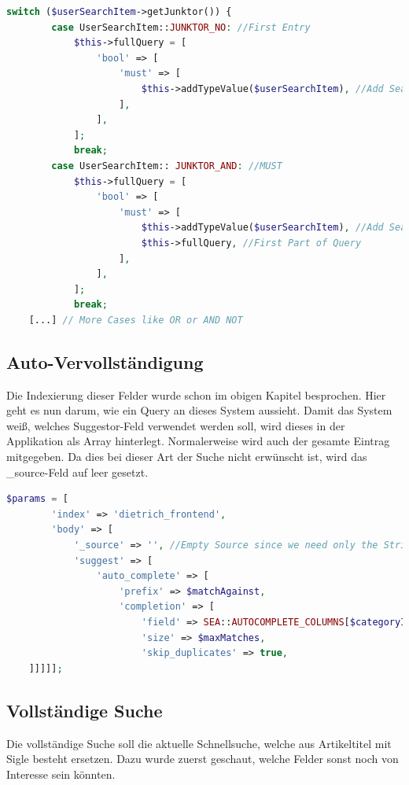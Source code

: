 \begin{lstlisting}[language=PHP, frame=single, label={lst:booleanEla}] 
    switch ($userSearchItem->getJunktor()) {
        case UserSearchItem::JUNKTOR_NO: //First Entry
            $this->fullQuery = [
                'bool' => [
                    'must' => [
                        $this->addTypeValue($userSearchItem), //Add Search
                    ],
                ],
            ];
            break;
        case UserSearchItem:: JUNKTOR_AND: //MUST
            $this->fullQuery = [
                'bool' => [
                    'must' => [
                        $this->addTypeValue($userSearchItem), //Add Search
                        $this->fullQuery, //First Part of Query
                    ],
                ],
            ];
            break;
    [...] // More Cases like OR or AND NOT
\end{lstlisting}

\subsection{Auto-Vervollständigung}

Die Indexierung dieser Felder wurde schon im obigen Kapitel besprochen. Hier geht es nun darum, wie ein Query an dieses System aussieht. Damit das System weiß, welches Suggestor-Feld verwendet werden soll, wird dieses in der Applikation als Array hinterlegt. Normalerweise wird auch der gesamte Eintrag mitgegeben. Da dies bei dieser Art der Suche nicht erwünscht ist, wird das \_source-Feld auf leer gesetzt.


\begin{lstlisting}[language=PHP, frame=single, label={lst:autocompleParams}] 
    $params = [
        'index' => 'dietrich_frontend',
        'body' => [
            '_source' => '', //Empty Source since we need only the String
            'suggest' => [
                'auto_complete' => [
                    'prefix' => $matchAgainst,
                    'completion' => [
                        'field' => SEA::AUTOCOMPLETE_COLUMNS[$categoryIndex],
                        'size' => $maxMatches,
                        'skip_duplicates' => true,
    ]]]]];
\end{lstlisting}

\subsection{Vollständige Suche}

Die vollständige Suche soll die aktuelle Schnellsuche, welche aus Artikeltitel mit Sigle besteht ersetzen. Dazu wurde zuerst geschaut, welche Felder sonst noch von Interesse sein könnten. 

